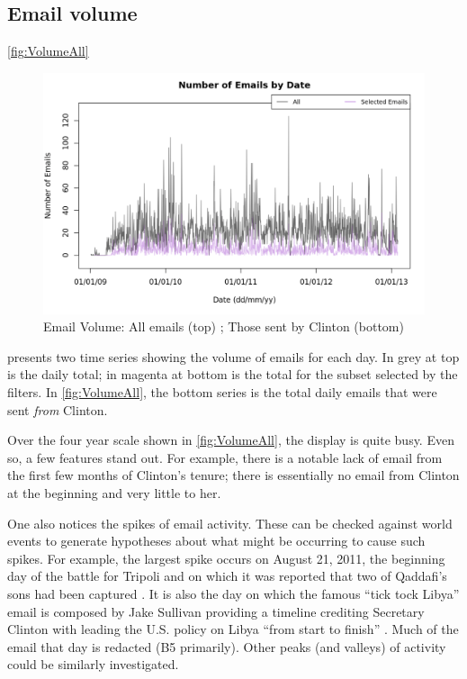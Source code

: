 \documentclass[journal]{vgtc}                %
\begin{document}
\subsection{Email volume}
\label{sect:Displays:volume}
\autoref{fig:VolumeAll} 
\begin{figure}[h]
\begin{center}
\includegraphics[width=0.95\linewidth]{VolumeFullTime}
\caption{Email Volume: All emails (top) ; Those sent by Clinton (bottom)}
\label{fig:VolumeAll}
\end{center}
\end{figure}
presents two time series showing the volume of emails for each day.  In grey at top is the daily total; in magenta at bottom is the total for the subset selected by the filters.  In \autoref{fig:VolumeAll}, the bottom series is the total daily emails that were sent \emph{from} Clinton.

Over the four year scale shown in \autoref{fig:VolumeAll}, the display is quite busy.  Even so, a few features stand out.  For example, there is a notable lack of email from the first few months of Clinton's tenure;  there is essentially no email from Clinton at the beginning and very little to her.   

One also notices the spikes of email activity.  These can be checked against world events to generate hypotheses about what might be occurring to cause such spikes.  For example, the largest spike occurs on August 21, 2011, the beginning day of the battle for Tripoli and on which it was reported that two of Qaddafi's sons had been captured \cite{battleTripoli}.  It is also the day on which the famous ``tick tock Libya'' email is composed by Jake Sullivan providing a timeline crediting Secretary Clinton with leading the U.S.  policy on Libya ``from start to finish'' \cite{tickTockLibya}.  Much of the email that day is redacted (B5 primarily).   Other peaks (and valleys) of activity could be similarly investigated.
\end{document}
